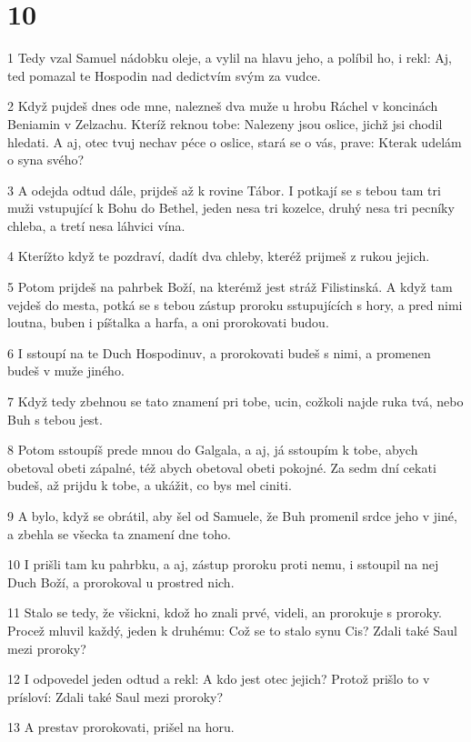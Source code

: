 \chapter{10}

\par 1 Tedy vzal Samuel nádobku oleje, a vylil na hlavu jeho, a políbil ho, i rekl: Aj, ted pomazal te Hospodin nad dedictvím svým za vudce.
\par 2 Když pujdeš dnes ode mne, nalezneš dva muže u hrobu Ráchel v koncinách Beniamin v Zelzachu. Kteríž reknou tobe: Nalezeny jsou oslice, jichž jsi chodil hledati. A aj, otec tvuj nechav péce o oslice, stará se o vás, prave: Kterak udelám o syna svého?
\par 3 A odejda odtud dále, prijdeš až k rovine Tábor. I potkají se s tebou tam tri muži vstupující k Bohu do Bethel, jeden nesa tri kozelce, druhý nesa tri pecníky chleba, a tretí nesa láhvici vína.
\par 4 Kterížto když te pozdraví, dadít dva chleby, kteréž prijmeš z rukou jejich.
\par 5 Potom prijdeš na pahrbek Boží, na kterémž jest stráž Filistinská. A když tam vejdeš do mesta, potká se s tebou zástup proroku sstupujících s hory, a pred nimi loutna, buben i píštalka a harfa, a oni prorokovati budou.
\par 6 I sstoupí na te Duch Hospodinuv, a prorokovati budeš s nimi, a promenen budeš v muže jiného.
\par 7 Když tedy zbehnou se tato znamení pri tobe, ucin, cožkoli najde ruka tvá, nebo Buh s tebou jest.
\par 8 Potom sstoupíš prede mnou do Galgala, a aj, já sstoupím k tobe, abych obetoval obeti zápalné, též abych obetoval obeti pokojné. Za sedm dní cekati budeš, až prijdu k tobe, a ukážit, co bys mel ciniti.
\par 9 A bylo, když se obrátil, aby šel od Samuele, že Buh promenil srdce jeho v jiné, a zbehla se všecka ta znamení dne toho.
\par 10 I prišli tam ku pahrbku, a aj, zástup proroku proti nemu, i sstoupil na nej Duch Boží, a prorokoval u prostred nich.
\par 11 Stalo se tedy, že všickni, kdož ho znali prvé, videli, an prorokuje s proroky. Procež mluvil každý, jeden k druhému: Což se to stalo synu Cis? Zdali také Saul mezi proroky?
\par 12 I odpovedel jeden odtud a rekl: A kdo jest otec jejich? Protož prišlo to v prísloví: Zdali také Saul mezi proroky?
\par 13 A prestav prorokovati, prišel na horu.
